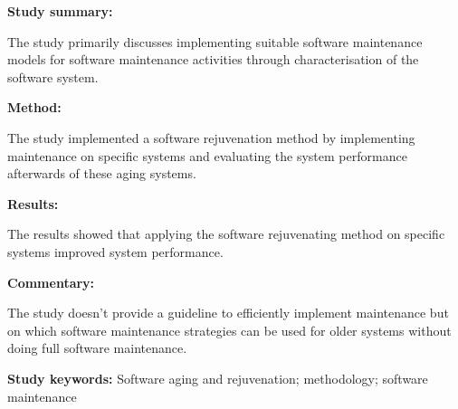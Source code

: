 \begin{tcolorbox}[colback=gray!5!white, colframe=pastelgreen!40!black, title=A Software Maintenance Methodology: An Approach Applied to Software Aging\cite{Araujo2021}]
	\begin{minipage}[t]{0.25\textwidth}
		\textbf{Study summary:}
	\end{minipage}
	\hfill
	\begin{minipage}[t]{0.65\textwidth}
		The study primarily discusses implementing suitable software maintenance models for software
		maintenance activities through characterisation of the software system.
	\end{minipage}

	\vspace{0.75em} 

	\begin{minipage}[t]{0.25\textwidth}
		\textbf{Method:}
	\end{minipage}
	\hfill
	\begin{minipage}[t]{0.65\textwidth}
		The study implemented a software rejuvenation method by implementing maintenance on specific systems and evaluating the system performance afterwards of these aging systems.
	\end{minipage}

	\vspace{0.75em} 

	\begin{minipage}[t]{0.25\textwidth}
		\textbf{Results:}
	\end{minipage}
	\hfill
	\begin{minipage}[t]{0.65\textwidth}
		The results showed that applying the software rejuvenating method on specific systems improved system performance.
	\end{minipage}

	\vspace{0.75em} 

	\begin{minipage}[t]{0.25\textwidth}
		\textbf{Commentary:}
	\end{minipage}
	\hfill
	\begin{minipage}[t]{0.65\textwidth}
		The study doesn't provide a guideline to efficiently implement maintenance but on which
		software maintenance strategies can be used for older systems without doing full software maintenance.
	\end{minipage}
	\tcblower
	\textbf{Study keywords:} Software aging and rejuvenation; methodology; software maintenance
\end{tcolorbox}


